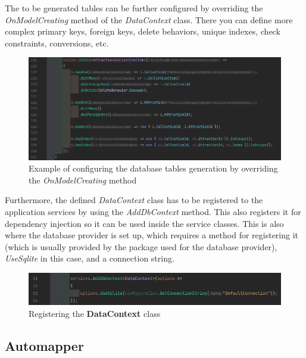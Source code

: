 \par The to be generated tables can be further configured by overriding the \textit{OnModelCreating} method of the \textit{DataContext} class. There you can define more complex primary keys, foreign keys, delete behaviors, unique indexes, check constraints, conversions, etc.

\clearpage %

\begin{figure}[!ht]
    \centering
    \includegraphics[width=0.95\linewidth]{4.3.1_sample-of-OnModelCreating.png}
    \caption{Example of configuring the database tables generation by overriding the \textit{OnModelCreating} method}
    \label{fig:enter-label}
\end{figure}

\par Furthermore, the defined \textit{DataContext} class has to be registered to the application services by using the \textit{AddDbContext} method. This also registers it for dependency injection so it can be used inside the service classes. This is also where the database provider is set up, which requires a method for registering it (which is usually provided by the package used for the database provider), \textit{UseSqlite} in this case, and a connection string.

\begin{figure}[!ht]
    \centering
    \includegraphics[width=1\linewidth]{4.3.1_AddDbContext.png}
    \caption{Registering the \textbf{DataContext} class}
    \label{fig:enter-label}
\end{figure}


\subsection{Automapper}

